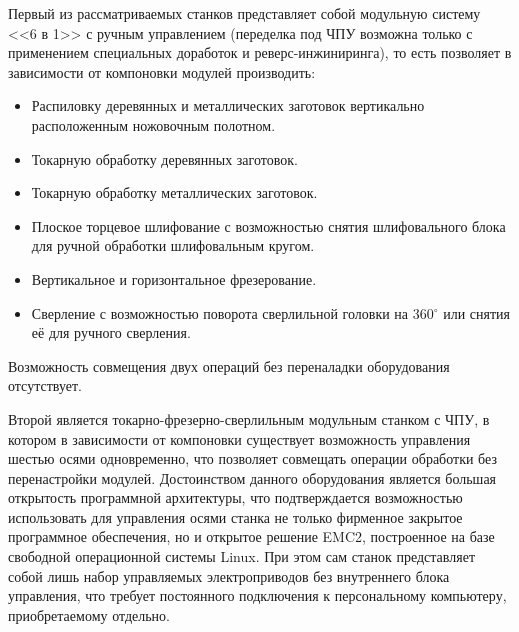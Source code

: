 Первый из рассматриваемых станков представляет собой модульную систему <<6 в 1>> с ручным управлением (переделка под ЧПУ возможна только с применением специальных доработок и реверс-инжиниринга), то есть позволяет в зависимости от компоновки модулей производить:
\begin{itemize}
	\item Распиловку деревянных и металлических заготовок вертикально расположенным ножовочным полотном.
	
	\item Токарную обработку деревянных заготовок.
	
	\item Токарную обработку металлических заготовок.
	
	\item Плоское торцевое шлифование с возможностью снятия шлифовального блока для ручной обработки шлифовальным кругом.
	
	\item Вертикальное и горизонтальное фрезерование.
	
	\item Сверление с возможностью поворота сверлильной головки на 360$^{\circ}$ или снятия её для ручного сверления.
	
	
\end{itemize}
Возможность совмещения двух операций без переналадки оборудования отсутствует.

Второй является токарно-фрезерно-сверлильным модульным станком с ЧПУ, в котором в зависимости от компоновки существует возможность управления шестью осями одновременно, что позволяет совмещать операции обработки без перенастройки модулей. Достоинством данного оборудования является большая открытость программной архитектуры, что подтверждается возможностью использовать для управления осями станка не только фирменное закрытое программное обеспечения, но и открытое решение EMC2, построенное на базе свободной операционной системы Linux. При этом сам станок представляет собой лишь набор управляемых электроприводов без внутреннего блока управления, что требует постоянного подключения к персональному компьютеру, приобретаемому отдельно.

